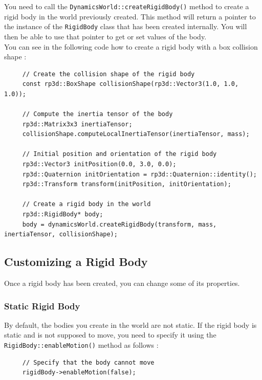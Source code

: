 \documentclass[a4paper,12pt]{article}
\begin{document}
    You need to call the \texttt{DynamicsWorld::createRigidBody()} method to create a rigid body in the world previously created. This method will return a pointer to the instance
    of the \texttt{RigidBody} class that has been created internally. You will then be able to use that pointer to get or set values of the body. \\

    You can see in the following code how to create a rigid body with a box collision shape : \\

    \begin{lstlisting}
     // Create the collision shape of the rigid body
     const rp3d::BoxShape collisionShape(rp3d::Vector3(1.0, 1.0, 1.0));

     // Compute the inertia tensor of the body
     rp3d::Matrix3x3 inertiaTensor;
     collisionShape.computeLocalInertiaTensor(inertiaTensor, mass);

     // Initial position and orientation of the rigid body
     rp3d::Vector3 initPosition(0.0, 3.0, 0.0);
     rp3d::Quaternion initOrientation = rp3d::Quaternion::identity();
     rp3d::Transform transform(initPosition, initOrientation);

     // Create a rigid body in the world
     rp3d::RigidBody* body;
     body = dynamicsWorld.createRigidBody(transform, mass, inertiaTensor, collisionShape);
  \end{lstlisting}

    \subsection{Customizing a Rigid Body}

    Once a rigid body has been created, you can change some of its properties.

    \subsubsection{Static Rigid Body}

    \begin{sloppypar}
        By default, the bodies you create in the world are not static. If the rigid body is static and is not supposed to move, you need to specify it using the \texttt{RigidBody::enableMotion()}
        method as follows : \\
    \end{sloppypar}

    \begin{lstlisting}
     // Specify that the body cannot move
     rigidBody->enableMotion(false);
  \end{lstlisting}
\end{document}
